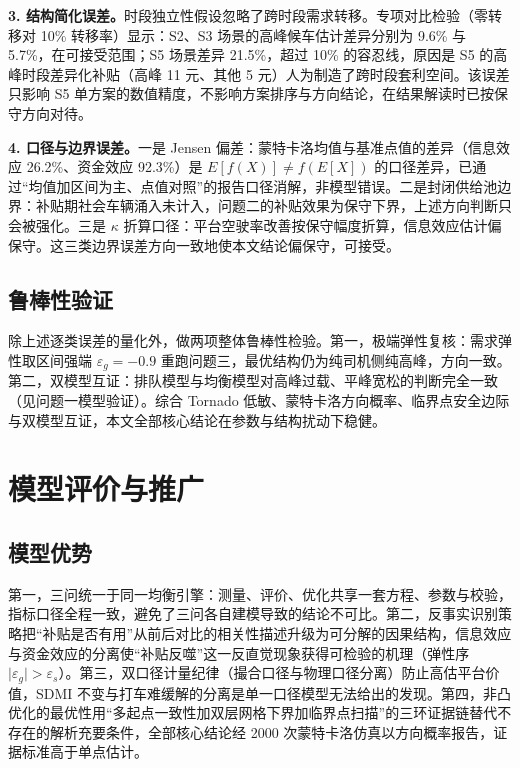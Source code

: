 \documentclass[12pt,a4paper]{ctexart}
\begin{document}
\textbf{3. 结构简化误差。}时段独立性假设忽略了跨时段需求转移。专项对比检验（零转移对 10\% 转移率）显示：S2、S3 场景的高峰候车估计差异分别为 9.6\% 与 5.7\%，在可接受范围；S5 场景差异 21.5\%，超过 10\% 的容忍线，原因是 S5 的高峰时段差异化补贴（高峰 11 元、其他 5 元）人为制造了跨时段套利空间。该误差只影响 S5 单方案的数值精度，不影响方案排序与方向结论，在结果解读时已按保守方向对待。

\textbf{4. 口径与边界误差。}一是 Jensen 偏差：蒙特卡洛均值与基准点值的差异（信息效应 26.2\%、资金效应 92.3\%）是 $E[f(X)]\ne f(E[X])$ 的口径差异，已通过“均值加区间为主、点值对照”的报告口径消解，非模型错误。二是封闭供给池边界：补贴期社会车辆涌入未计入，问题二的补贴效果为保守下界，上述方向判断只会被强化。三是 $\kappa$ 折算口径：平台空驶率改善按保守幅度折算，信息效应估计偏保守。这三类边界误差方向一致地使本文结论偏保守，可接受。

\subsection{鲁棒性验证}

除上述逐类误差的量化外，做两项整体鲁棒性检验。第一，极端弹性复核：需求弹性取区间强端 $\varepsilon_g=-0.9$ 重跑问题三，最优结构仍为纯司机侧纯高峰，方向一致。第二，双模型互证：排队模型与均衡模型对高峰过载、平峰宽松的判断完全一致（见问题一模型验证）。综合 Tornado 低敏、蒙特卡洛方向概率、临界点安全边际与双模型互证，本文全部核心结论在参数与结构扰动下稳健。

\section{模型评价与推广}

\subsection{模型优势}

第一，三问统一于同一均衡引擎：测量、评价、优化共享一套方程、参数与校验，指标口径全程一致，避免了三问各自建模导致的结论不可比。第二，反事实识别策略把“补贴是否有用”从前后对比的相关性描述升级为可分解的因果结构，信息效应与资金效应的分离使“补贴反噬”这一反直觉现象获得可检验的机理（弹性序 $\lvert\varepsilon_g\rvert>\varepsilon_s$）。第三，双口径计量纪律（撮合口径与物理口径分离）防止高估平台价值，SDMI 不变与打车难缓解的分离是单一口径模型无法给出的发现。第四，非凸优化的最优性用“多起点一致性加双层网格下界加临界点扫描”的三环证据链替代不存在的解析充要条件，全部核心结论经 2000 次蒙特卡洛仿真以方向概率报告，证据标准高于单点估计。
\end{document}
